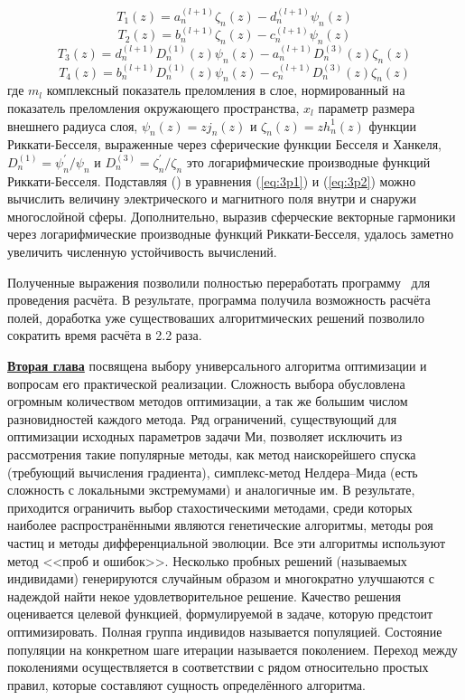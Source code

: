 \begin{equation*}
  T_1(z) =   a^{(l+1)}_{n}  \zeta_{n}(z) 
           - d^{(l+1)}_{n}  \psi_{n}(z)
\end{equation*}
\begin{equation*}
  T_2(z) =   b^{(l+1)}_{n}  \zeta_{n}(z) 
           - c^{(l+1)}_{n}  \psi_{n}(z)
\end{equation*}
\begin{equation*}
  T_3(z) =  d^{(l+1)}_{n}  D^{(1)}_{n}(z)  \psi_{n}(z) 
          - a^{(l+1)}_{n}  D^{(3)}_{n}(z)  \zeta_{n} (z)
\end{equation*}
\begin{equation*}
  T_4(z) =  b^{(l+1)}_{n}  D^{(1)}_{n}(z)  \psi_{n}(z) 
          - c^{(l+1)}_{n}  D^{(3)}_{n}(z)  \zeta_{n} (z)
\end{equation*}
где $m_l$ комплексный показатель преломления в слое, нормированный на
показатель преломления окружающего пространства, $x_l$ параметр
размера внешнего радиуса слоя, $\psi_{n}(z) = z j_n(z)$ и
$\zeta_{n}(z) = z h_n^1(z)$ функции Риккати-Бесселя, выраженные через
сферические функции Бесселя и Ханкеля,
$D^{(1)}_{n} = \psi^{\prime}_{n}/\psi_{n}$ и
$D^{(3)}_{n} = \zeta^{\prime}_{n}/\zeta_{n}$ это логарифмические
производные функций Риккати-Бесселя. Подставляя
() в уравнения (\ref{eq:3p1}) и
(\ref{eq:3p2}) можно вычислить величину электрического и магнитного
поля внутри и снаружи многослойной сферы. Дополнительно, выразив
сферческие векторные гармоники через логарифмические производные
функций Риккати-Бесселя, удалось заметно увеличить численную
устойчивость вычислений.

Полученные выражения позволили полностью переработать
программу~\cite{Scattnlay-web} для проведения расчёта.  В результате,
программа получила возможность расчёта полей, доработка уже
существоваших алгоритмических решений позволило сократить время
расчёта в 2.2 раза.

\underline{\textbf{Вторая глава}} посвящена выбору универсального
алгоритма оптимизации и вопросам его практической
реализации. Сложность выбора обусловлена огромным количеством методов
оптимизации, а так же большим числом разновидностей каждого
метода. Ряд ограничений, существующий для оптимизации исходных
параметров задачи Ми, позволяет исключить из рассмотрения такие
популярные методы, как метод наискорейшего спуска (требующий
вычисления градиента), симплекс-метод Нелдера--Мида (есть сложность с
локальными экстремумами) и аналогичные им. В результате, приходится
ограничить выбор стахостическими методами, среди которых наиболее
распространёнными являются генетические алгоритмы, методы роя частиц и
методы дифференциальной эволюции.  Все эти алгоритмы используют метод
<<проб и ошибок>>.  Несколько пробных решений (называемых индивидами)
генерируются случайным образом и многократно улучшаются с надеждой
найти некое удовлетворительное решение. Качество решения оценивается
целевой функцией, формулируемой в задаче, которую предстоит
оптимизировать.  Полная группа индивидов называется популяцией.
Состояние популяции на конкретном шаге итерации называется поколением.
Переход между поколениями осуществляется в соответствии с рядом
относительно простых правил, которые составляют сущность определённого
алгоритма.

